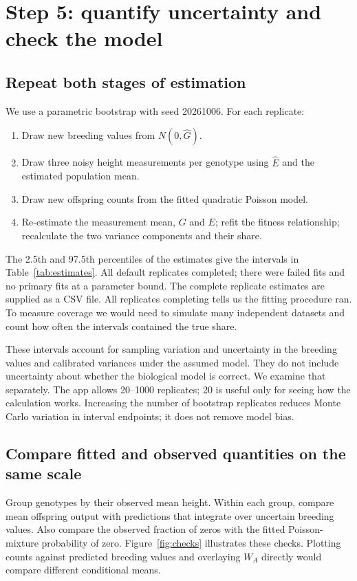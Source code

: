 \documentclass[11pt]{article}
\begin{document}
\section{Step 5: quantify uncertainty and check the model}

\subsection{Repeat both stages of estimation}
We use a parametric bootstrap with seed 20261006. For each replicate:
\begin{enumerate}[itemsep=2pt]
\item Draw new breeding values from $N(0,\widehat G)$.
\item Draw three noisy height measurements per genotype using $\widehat E$ and the estimated population mean.
\item Draw new offspring counts from the fitted quadratic Poisson model.
\item Re-estimate the measurement mean, $G$ and $E$; refit the fitness relationship; recalculate the two variance components and their share.
\end{enumerate}
The 2.5th and 97.5th percentiles of the estimates give the intervals in Table~\ref{tab:estimates}. All \BootstrapCount{} default replicates completed; there were \BootstrapFailures{} failed fits and no primary fits at a parameter bound. The complete replicate estimates are supplied as a CSV file. All replicates completing tells us the fitting procedure ran. To measure coverage we would need to simulate many independent datasets and count how often the intervals contained the true share.

These intervals account for sampling variation and uncertainty in the breeding values and calibrated variances under the assumed model. They do not include uncertainty about whether the biological model is correct. We examine that separately. The app allows 20--1000 replicates; 20 is useful only for seeing how the calculation works. Increasing the number of bootstrap replicates reduces Monte Carlo variation in interval endpoints; it does not remove model bias.

\subsection{Compare fitted and observed quantities on the same scale}
Group genotypes by their observed mean height. Within each group, compare mean offspring output with predictions that integrate over uncertain breeding values. Also compare the observed fraction of zeros with the fitted Poisson-mixture probability of zero. Figure~\ref{fig:checks} illustrates these checks. Plotting counts against predicted breeding values and overlaying $W_A$ directly would compare different conditional means.
\end{document}
